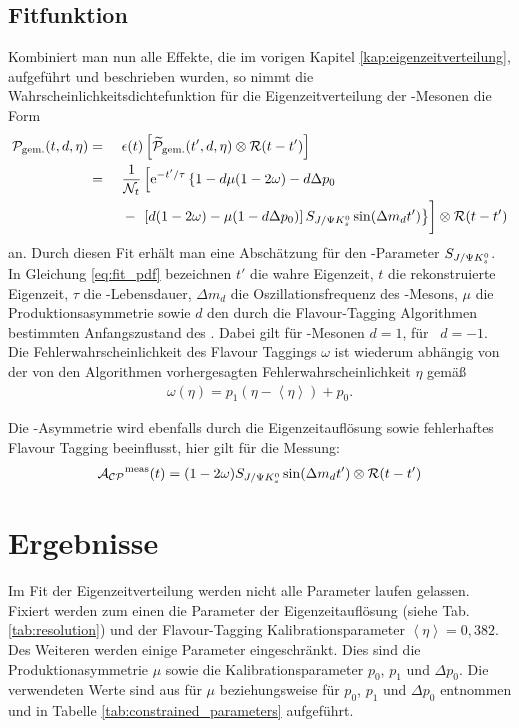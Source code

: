 \subsection{Fitfunktion}
Kombiniert man nun alle Effekte, die im vorigen Kapitel \ref{kap:eigenzeitverteilung}, aufgeführt und beschrieben wurden, so nimmt die Wahrscheinlichkeitsdichtefunktion für die Eigenzeitverteilung der \Bd-Mesonen die Form
\begin{alignat}{3}
\nonumber\mathcal{P}_{\text{gem.}}(t, d, \eta) &=\  &&  \epsilon(t)\left[\widetilde{\mathcal{P}}_{\text{gem.}}(t', d, \eta) \otimes \mathcal{R}(t-t')\right]\\
\nonumber &= &&\frac{1}{\mathcal{N}_t}\left[\e^{-t'/\tau} \left\lbrace 1-d\mu(1-2\omega)-d\Delta p_0 \right.\right.\\
& &&-\left.\vphantom{\frac{1}{\mathcal{N}_t}}\left.\left[d(1-2\omega)-\mu(1-d\Delta p_0)\right]\SJPsi\sin(\Delta m_d t')\right\rbrace\right]\otimes\mathcal{R}(t-t') \label{eq:fit_pdf}
\end{alignat}
an. Durch diesen Fit erhält man eine Abschätzung für den \CP-Parameter $S_{J/\Psi K_s^0}$. In Gleichung \ref{eq:fit_pdf} bezeichnen $t'$ die wahre Eigenzeit, $t$ die rekonstruierte Eigenzeit, $\tau$ die \Bd-Lebensdauer, $\Delta m_d$ die Oszillationsfrequenz des \Bd-Mesons, $\mu$ die Produktionsasymmetrie sowie $d$ den durch die Flavour-Tagging Algorithmen bestimmten Anfangszustand des \Bd. Dabei gilt für \Bd-Mesonen $d=1$, für \Bdbar\ $d=-1$. Die Fehlerwahrscheinlichkeit des Flavour Taggings $\omega$ ist wiederum abhängig von der von den Algorithmen vorhergesagten Fehlerwahrscheinlichkeit $\eta$ gemäß
\begin{align}
\omega(\eta) = p_1\left(\eta-\left\langle\eta\right\rangle\right) + p_0.
\end{align}

Die \CP-Asymmetrie wird ebenfalls durch die Eigenzeitauflösung sowie fehlerhaftes Flavour Tagging beeinflusst, hier gilt für die Messung:
\begin{align}
\mathcal{A_{CP}}^{\text{meas}}(t) = (1-2\omega)S_{J/\Psi K_s^0} \sin(\Delta m_d t') \otimes \mathcal{R}(t-t')
\end{align}


\section{Ergebnisse} \label{kap:fitergebnis}
Im Fit der Eigenzeitverteilung werden nicht alle Parameter laufen gelassen. Fixiert werden zum einen die Parameter der Eigenzeitauflösung (siehe Tab. \ref{tab:resolution}) und der Flavour-Tagging Kalibrationsparameter $\left\langle\eta\right\rangle = 0,382$. Des Weiteren werden einige Parameter eingeschränkt. Dies sind die Produktionasymmetrie $\mu$ sowie die Kalibrationsparameter $p_0$, $p_1$ und $\Delta p_0$. Die verwendeten Werte sind aus \cite{lhcb-paper} für $\mu$ beziehungsweise \cite{tagging} für $p_0$, $p_1$ und $\Delta p_0$ entnommen und in Tabelle \ref{tab:constrained_parameters} aufgeführt.

